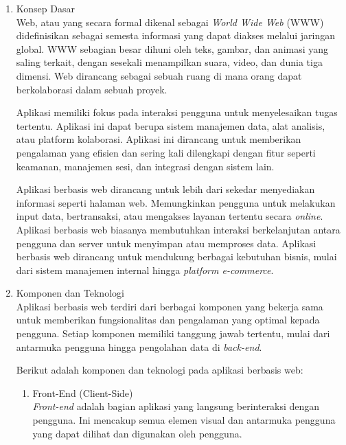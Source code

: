\begin{enumerate}[label*=\arabic*.,ref=\arabic*]
    \item Konsep Dasar\\
        Web, atau yang secara formal dikenal sebagai \textit{World Wide Web} (WWW) didefinisikan sebagai semesta informasi yang dapat diakses melalui jaringan global. WWW sebagian besar dihuni oleh teks, gambar, dan animasi yang saling terkait, dengan sesekali menampilkan suara, video, dan dunia tiga dimensi. Web dirancang sebagai sebuah ruang di mana orang dapat berkolaborasi dalam sebuah proyek.
        
        Aplikasi memiliki fokus pada interaksi pengguna untuk menyelesaikan tugas tertentu. Aplikasi ini dapat berupa sistem manajemen data, alat analisis, atau platform kolaborasi. Aplikasi ini dirancang untuk memberikan pengalaman yang efisien dan sering kali dilengkapi dengan fitur seperti keamanan, manajemen sesi, dan integrasi dengan sistem lain.

        Aplikasi berbasis web dirancang untuk lebih dari sekedar menyediakan informasi seperti halaman web. Memungkinkan pengguna untuk melakukan input data, bertransaksi, atau mengakses layanan tertentu secara \textit{online}. Aplikasi berbasis web biasanya membutuhkan interaksi berkelanjutan antara pengguna dan server untuk menyimpan atau memproses data. Aplikasi berbasis web dirancang untuk mendukung berbagai kebutuhan bisnis, mulai dari sistem manajemen internal hingga \textit{platform e-commerce}.
        
    \item Komponen dan Teknologi\\
        Aplikasi berbasis web terdiri dari berbagai komponen yang bekerja sama untuk memberikan fungsionalitas dan pengalaman yang optimal kepada pengguna. Setiap komponen memiliki tanggung jawab tertentu, mulai dari antarmuka pengguna hingga pengolahan data di \textit{back-end}.


        Berikut adalah komponen dan teknologi pada aplikasi berbasis web:

        \begin{enumerate}[label=\alph*.]
            \item Front-End (Client-Side)\\
                \textit{Front-end} adalah bagian aplikasi yang langsung berinteraksi dengan pengguna. Ini mencakup semua elemen visual dan antarmuka pengguna yang dapat dilihat dan digunakan oleh pengguna.


\end{enumerate}
\end{enumerate}
